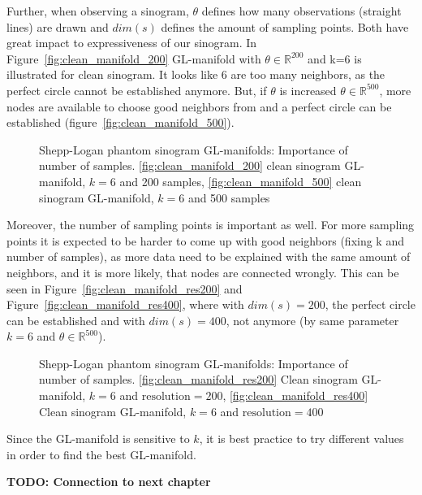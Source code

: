 Further, when observing a sinogram, $\theta$ defines how many observations (straight lines) are drawn
and $dim(s)$ defines the amount of sampling points. Both have great impact to expressiveness of our sinogram.
In Figure~\ref{fig:clean_manifold_200} GL-manifold with $\theta \in \mathbb{R}^{200}$ and k=6 is illustrated
for clean sinogram. It looks like 6 are too many neighbors, as the perfect circle cannot be established anymore.
But, if $\theta$ is increased $\theta \in \mathbb{R}^{500}$, more nodes are available to choose good neighbors from
and a perfect circle can be established (figure~\ref{fig:clean_manifold_500}).

\begin{figure}[H]
    \centering
    \hfill
    \hfill
    \hfill
    \caption{Shepp-Logan phantom sinogram GL-manifolds: Importance of number of samples.
    \ref{fig:clean_manifold_200} clean sinogram GL-manifold, $k = 6$ and 200 samples,
    \ref{fig:clean_manifold_500} clean sinogram GL-manifold, $k = 6$ and 500 samples}
\end{figure}

Moreover, the number of sampling points is important as well.
For more sampling points it is expected to be harder to come up with good neighbors (fixing k and number of samples),
as more data need to be explained with the same amount of neighbors, and it is more likely, that nodes are connected wrongly.
This can be seen in Figure~\ref{fig:clean_manifold_res200} and Figure~\ref{fig:clean_manifold_res400}, where with $dim(s) = 200$,
the perfect circle can be established and with $dim(s) = 400$, not anymore (by same parameter $k = 6$ and $\theta \in \mathbb{R}^{500}$).

\begin{figure}[H]
    \centering
    \hfill
    \hfill
    \hfill
    \caption{Shepp-Logan phantom sinogram GL-manifolds: Importance of number of samples.
    \ref{fig:clean_manifold_res200} Clean sinogram GL-manifold, $k = 6$ and $\text{resolution}=200$,
    \ref{fig:clean_manifold_res400} Clean sinogram GL-manifold, $k = 6$ and $\text{resolution}=400$}
\end{figure}


\begin{tcolorbox}[colback=red!5!white,colframe=red!75!black]
    Since the GL-manifold is sensitive to $k$, it is best practice to try different values in order to find the best GL-manifold.
\end{tcolorbox}



\textbf{TODO: Connection to next chapter}